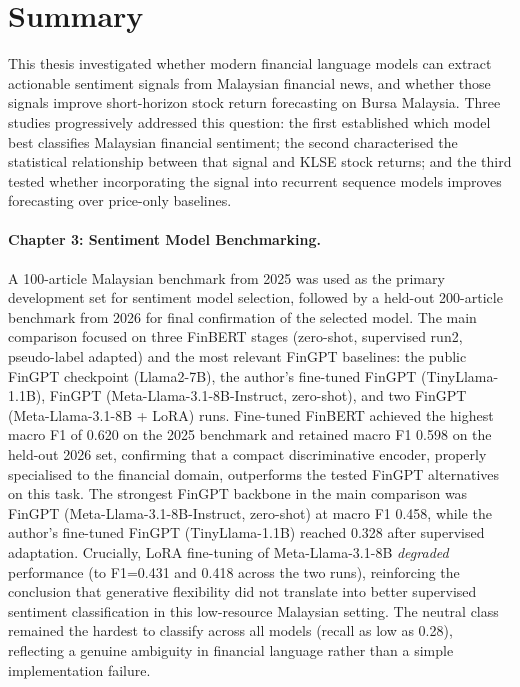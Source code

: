 \documentclass[12pt]{ucetd}
\begin{document}
\section{Summary}

This thesis investigated whether modern financial language models can extract actionable sentiment signals from Malaysian financial news, and whether those signals improve short-horizon stock return forecasting on Bursa Malaysia. Three studies progressively addressed this question: the first established which model best classifies Malaysian financial sentiment; the second characterised the statistical relationship between that signal and KLSE stock returns; and the third tested whether incorporating the signal into recurrent sequence models improves forecasting over price-only baselines.

\paragraph{Chapter 3: Sentiment Model Benchmarking.}
A 100-article Malaysian benchmark from 2025 was used as the primary development set for sentiment model selection, followed by a held-out 200-article benchmark from 2026 for final confirmation of the selected model. The main comparison focused on three FinBERT stages (zero-shot, supervised run2, pseudo-label adapted) and the most relevant FinGPT baselines: the public FinGPT checkpoint (Llama2-7B), the author's fine-tuned FinGPT (TinyLlama-1.1B), FinGPT (Meta-Llama-3.1-8B-Instruct, zero-shot), and two FinGPT (Meta-Llama-3.1-8B + LoRA) runs. Fine-tuned FinBERT achieved the highest macro F1 of 0.620 on the 2025 benchmark and retained macro F1 0.598 on the held-out 2026 set, confirming that a compact discriminative encoder, properly specialised to the financial domain, outperforms the tested FinGPT alternatives on this task. The strongest FinGPT backbone in the main comparison was FinGPT (Meta-Llama-3.1-8B-Instruct, zero-shot) at macro F1 0.458, while the author's fine-tuned FinGPT (TinyLlama-1.1B) reached 0.328 after supervised adaptation. Crucially, LoRA fine-tuning of Meta-Llama-3.1-8B \emph{degraded} performance (to F1=0.431 and 0.418 across the two runs), reinforcing the conclusion that generative flexibility did not translate into better supervised sentiment classification in this low-resource Malaysian setting. The neutral class remained the hardest to classify across all models (recall as low as 0.28), reflecting a genuine ambiguity in financial language rather than a simple implementation failure.
\end{document}
